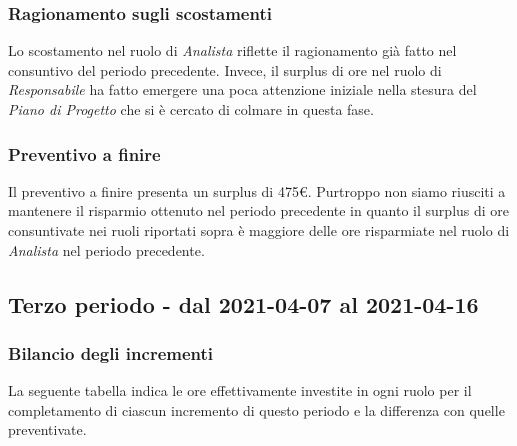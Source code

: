 {{{{{{{{{{		\subsubsection{Ragionamento sugli scostamenti}\label{ConsuntivoSecondoPeriodoDiProgettazioneDiDettaglioCodificaRagionamentoScostamenti}
		Lo scostamento nel ruolo di \textit{Analista} riflette il ragionamento già fatto nel consuntivo del periodo precedente.
		Invece, il surplus di ore nel ruolo di \textit{Responsabile} ha fatto emergere una poca attenzione iniziale nella stesura del \textit{Piano di Progetto} che si è cercato di colmare in questa fase.
		
		\subsubsection{Preventivo a finire}\label{ConsuntivoSecondoPeriodoDiProgettazioneDiDettaglioCodificaPreventivoFinire}
		Il preventivo a finire presenta un surplus di 475\euro. 
		Purtroppo non siamo riusciti a mantenere il risparmio ottenuto nel periodo precedente in quanto il surplus di ore consuntivate nei ruoli riportati sopra è maggiore delle ore risparmiate nel ruolo di \textit{Analista} nel periodo precedente. 
		
\subsection{Terzo periodo - dal 2021-04-07 al 2021-04-16 }\label{ConsuntivoTerzoPeriodoDiProgettazioneDiDettaglioCodifica}

\subsubsection{Bilancio degli incrementi}\label{ConsuntivoTerzoPeriodoDiProgettazioneDiDettaglioCodificaIncrementi}

La seguente tabella indica le ore effettivamente investite in ogni ruolo per il completamento di ciascun incremento di questo periodo e la differenza con quelle preventivate.

\quad
\def\tabularxcolumn#1{m{#1}}
{
	
}}}}}}}}}}}
